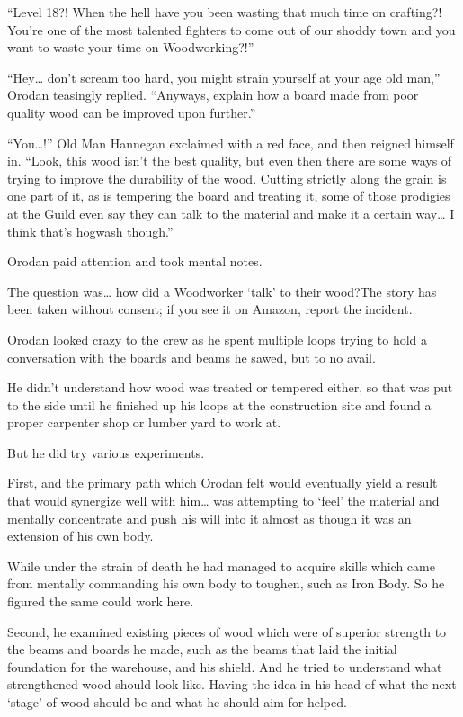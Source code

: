 \documentclass[a4paper,10pt]{book}
\begin{document}
“Level 18?! When the hell have you been wasting that much time on crafting?! You’re one of the most talented fighters to come out of our shoddy town and you want to waste your time on Woodworking?!”\par
“Hey… don’t scream too hard, you might strain yourself at your age old man,” Orodan teasingly replied. “Anyways, explain how a board made from poor quality wood can be improved upon further.”\par
“You…!” Old Man Hannegan exclaimed with a red face, and then reigned himself in. “Look, this wood isn’t the best quality, but even then there are some ways of trying to improve the durability of the wood. Cutting strictly along the grain is one part of it, as is tempering the board and treating it, some of those prodigies at the Guild even say they can talk to the material and make it a certain way… I think that's hogwash though.”\par
Orodan paid attention and took mental notes.\par
\par
The question was… how did a Woodworker ‘talk’ to their wood?The story has been taken without consent; if you see it on Amazon, report the incident.\par
Orodan looked crazy to the crew as he spent multiple loops trying to hold a conversation with the boards and beams he sawed, but to no avail.\par
He didn’t understand how wood was treated or tempered either, so that was put to the side until he finished up his loops at the construction site and found a proper carpenter shop or lumber yard to work at.\par
But he did try various experiments.\par
First, and the primary path which Orodan felt would eventually yield a result that would synergize well with him… was attempting to ‘feel’ the material and mentally concentrate and push his will into it almost as though it was an extension of his own body.\par
While under the strain of death he had managed to acquire skills which came from mentally commanding his own body to toughen, such as Iron Body. So he figured the same could work here.\par
Second, he examined existing pieces of wood which were of superior strength to the beams and boards he made, such as the beams that laid the initial foundation for the warehouse, and his shield. And he tried to understand what strengthened wood should look like. Having the idea in his head of what the next ‘stage’ of wood should be and what he should aim for helped.\par
\end{document}
